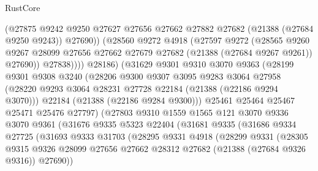 \begin{lexlean}{RustCore}
\begin{coremodule}
                      (@27875
                        @9242
                        @9250
                        @27627
                        @27656
                        @27662
                        @27882
                        @27682
                        (@21388 (@27684 @9250 @9243))
                        @27690))
                    (@28560
                      @9272
                      @4918
                      (@27597
                        @9272
                        (@28565
                          @9260
                          @9267
                          @28099
                          @27656
                          @27662
                          @27679
                          @27682
                          (@21388 (@27684 @9267 @9261))
                          @27690))
                      @27838))))
              @28186)
            (@31629
              @9301
              @9310
              @3070
              @9363
              (@28199
                @9301
                @9308
                @3240
                (@28206
                  @9300
                  @9307
                  @3095
                  @9283
                  @3064
                  @27958
                  (@28220 @9293 @3064 @28231 @27728 @22184 (@21388 (@22186 @9294 @3070)))
                  @22184
                  (@21388 (@22186 @9284 @9300)))
                @25461
                @25464
                @25467
                @25471
                @25476
                @27797)
              (@27803
                @9310
                @1559
                @1565
                @121
                @3070
                @9336
                @3070
                @9361
                (@31676
                  @9335
                  @5323
                  @22404
                  (@31681
                    @9335
                    (@31686
                      @9334
                      @27725
                      (@31693
                        @9333
                        @31703
                        (@28295
                          @9331
                          @4918
                          (@28299
                            @9331
                            (@28305
                              @9315
                              @9326
                              @28099
                              @27656
                              @27662
                              @28312
                              @27682
                              (@21388 (@27684 @9326 @9316))
                              @27690))

\end{coremodule}
\end{lexlean}
